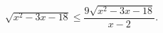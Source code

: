 \begin{ex}[type=inequality]
	\begin{condition}
		$\sqrt{x^2 - 3x - 18}\leqslant\dfrac{9\sqrt{x^2 - 3x - 18}}{x - 2}.$
	\end{condition}
\end{ex}